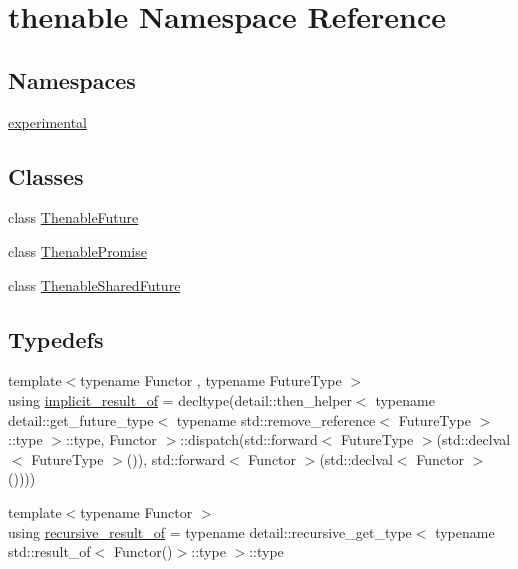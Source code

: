 \hypertarget{namespacethenable}{}\section{thenable Namespace Reference}
\label{namespacethenable}
\subsection*{Namespaces}
\begin{DoxyCompactItemize}
\item 
 \hyperlink{namespacethenable_1_1experimental}{experimental}
\end{DoxyCompactItemize}
\subsection*{Classes}
\begin{DoxyCompactItemize}
\item 
class \hyperlink{classthenable_1_1_thenable_future}{Thenable\+Future}
\item 
class \hyperlink{classthenable_1_1_thenable_promise}{Thenable\+Promise}
\item 
class \hyperlink{classthenable_1_1_thenable_shared_future}{Thenable\+Shared\+Future}
\end{DoxyCompactItemize}
\subsection*{Typedefs}
\begin{DoxyCompactItemize}
\item 
{\footnotesize template$<$typename Functor , typename Future\+Type $>$ }\\using \hyperlink{namespacethenable_a1ecf08d6ad8b8688d7b4df047b5feaae}{implicit\+\_\+result\+\_\+of} = decltype(detail\+::then\+\_\+helper$<$ typename detail\+::get\+\_\+future\+\_\+type$<$ typename std\+::remove\+\_\+reference$<$ Future\+Type $>$\+::type $>$\+::type, Functor $>$\+::dispatch(std\+::forward$<$ Future\+Type $>$(std\+::declval$<$ Future\+Type $>$()), std\+::forward$<$ Functor $>$(std\+::declval$<$ Functor $>$())))
\item 
{\footnotesize template$<$typename Functor $>$ }\\using \hyperlink{namespacethenable_a71ee91c31ba9c80bb2d6f3effe4bae12}{recursive\+\_\+result\+\_\+of} = typename detail\+::recursive\+\_\+get\+\_\+type$<$ typename std\+::result\+\_\+of$<$ Functor()$>$\+::type $>$\+::type
\end{DoxyCompactItemize}
